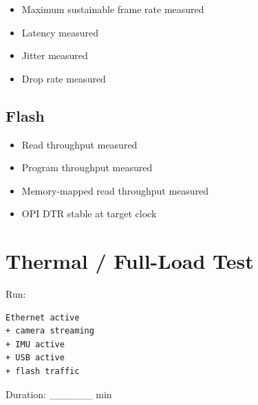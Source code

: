 \documentclass[10pt,a4paper,oneside]{report}
\providecommand{\tightlist}{\setlength{\itemsep}{1pt}\setlength{\parskip}{1pt}}
\begin{document}
\begin{itemize}
\tightlist
\item[$\square$]
  Maximum sustainable frame rate measured
\item[$\square$]
  Latency measured
\item[$\square$]
  Jitter measured
\item[$\square$]
  Drop rate measured
\end{itemize}

\subsection{Flash}\label{wiki-hardware-bring-up-and-testing--flash}

\begin{itemize}
\tightlist
\item[$\square$]
  Read throughput measured
\item[$\square$]
  Program throughput measured
\item[$\square$]
  Memory-mapped read throughput measured
\item[$\square$]
  OPI DTR stable at target clock
\end{itemize}

\section{Thermal / Full-Load Test}\label{wiki-hardware-bring-up-and-testing--22-thermal--full-load-test}

Run:

\begin{verbatim}
Ethernet active
+ camera streaming
+ IMU active
+ USB active
+ flash traffic
\end{verbatim}

Duration: \_\_\_\_\_\_ min
\end{document}
